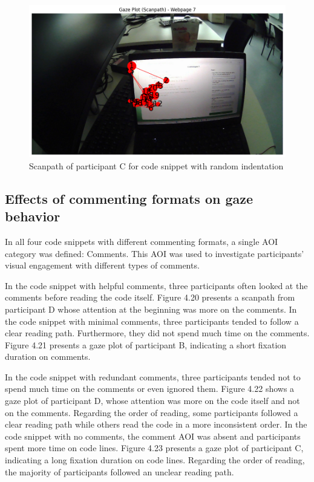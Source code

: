  



\begin{figure} [H]
  \centering
  \includegraphics[scale=0.6]{figures/r-ind.png}
  \caption{Scanpath of  participant C for code snippet with random indentation}
  \label{fig:AnhangsChor}
\end{figure}



\subsection{Effects of commenting formats on gaze behavior}

In all four code snippets with different commenting formats, a single AOI category was defined: Comments. This AOI was used to investigate participants’ visual engagement with different types of comments. 

In the code snippet with helpful comments, three participants often looked at the comments before reading the code itself.  Figure 4.20 presents a scanpath from participant D whose attention at the beginning was more on the comments. In the code snippet with minimal comments, three participants tended to follow a clear reading path.  Furthermore, they did not spend much time on the comments. Figure 4.21  presents a gaze plot of participant B, indicating a short fixation duration on comments. 


In the code snippet with redundant comments, three participants tended not to spend much time on the comments or even ignored them. Figure 4.22  shows a gaze plot of participant D, whose attention was more on the code itself and not on the comments. Regarding the order of reading, some participants followed a clear reading path while others read the code in a more inconsistent order.  In the code snippet with no comments, the comment AOI was absent and participants spent more time on code lines. Figure 4.23 presents a gaze plot of participant C, indicating a long fixation duration on code lines.    Regarding the order of reading, the majority of participants followed an unclear reading path.

